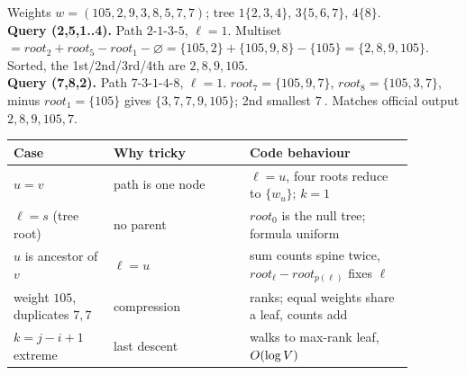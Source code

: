 \begin{tracebox}
Weights \(w=(105,2,9,3,8,5,7,7)\); tree \(1\{2,3,4\}\), \(3\{5,6,7\}\), \(4\{8\}\).\\
\textbf{Query (2,5,1..4).} Path \(2\text{-}1\text{-}3\text{-}5\), \(\ell=1\). Multiset \(=\mathit{root}_2+\mathit{root}_5-\mathit{root}_1-\varnothing=\{105,2\}+\{105,9,8\}-\{105\}=\{2,8,9,105\}\). Sorted, the 1st/2nd/3rd/4th are \(\boxed{2},\boxed{8},\boxed{9},\boxed{105}\).\\
\textbf{Query (7,8,2).} Path \(7\text{-}3\text{-}1\text{-}4\text{-}8\), \(\ell=1\). \(\mathit{root}_7=\{105,9,7\}\), \(\mathit{root}_8=\{105,3,7\}\), minus \(\mathit{root}_1=\{105\}\) gives \(\{3,7,7,9,105\}\); 2nd smallest \(\boxed{7\ }\).  Matches official output \(2,8,9,105,7\).
\end{tracebox}


\begin{center}\renewcommand{\arraystretch}{1.2}
\begin{tabular}{@{}p{0.22\linewidth} p{0.30\linewidth} p{0.36\linewidth}@{}}
\toprule
\textbf{Case} & \textbf{Why tricky} & \textbf{Code behaviour}\\
\midrule
\(u=v\) & path is one node & \(\ell=u\), four roots reduce to \(\{w_u\}\); \(k=1\) \\
\(\ell=s\) (tree root) & no parent & \(\mathit{root}_0\) is the null tree; formula uniform \\
\(u\) is ancestor of \(v\) & \(\ell=u\) & sum counts spine twice, \(\mathit{root}_\ell-\mathit{root}_{p(\ell)}\) fixes \(\ell\) \\
weight \(105\), duplicates \(7,7\) & compression & ranks; equal weights share a leaf, counts add \\
\(k=j-i+1\) extreme & last descent & walks to max-rank leaf, \(O(\log V)\) \\
\bottomrule
\end{tabular}\end{center}

